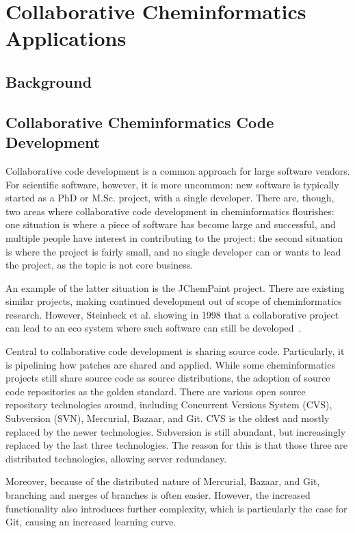 \documentclass[12pt]{book}
\begin{document}
\chapter{Collaborative Cheminformatics Applications}

\section{Background}

\section{Collaborative Cheminformatics Code Development}

Collaborative code development is a common approach for large software vendors.
For scientific software, however, it is more uncommon: new software is typically
started as a PhD or M.Sc. project, with a single developer. There are, though,
two areas where collaborative code development in cheminformatics flourishes:
one situation is where a piece of software has become large and successful,
and multiple people have interest in contributing to the project; the second
situation is where the project is fairly small, and no single developer can
or wants to lead the project, as the topic is not core business.

An example of the latter situation is the JChemPaint project. There are existing
similar projects, making continued development out of scope of cheminformatics
research. However, Steinbeck et al. showing in 1998 that a collaborative project
can lead to an eco system where such software can still be
developed~\cite{Krause2000}.

Central to collaborative code development is sharing source code. Particularly,
it is pipelining how patches are shared and applied. While some cheminformatics
projects still share source code as source distributions, the adoption of
source code repositories as the golden standard. There are various 
open source repository technologies around, including Concurrent Versions System (CVS),
Subversion (SVN), Mercurial, Bazaar, and Git. CVS is the oldest and mostly replaced
by the newer technologies. Subversion is still abundant, but increasingly
replaced by the last three technologies. The reason for this is that
those three are distributed technologies, allowing server redundancy.

Moreover, because of the distributed nature of Mercurial, Bazaar, and Git,
branching and merges of branches is often easier. However, the increased
functionality also introduces further complexity, which is particularly
the case for Git, causing an increased learning curve.
\end{document}
